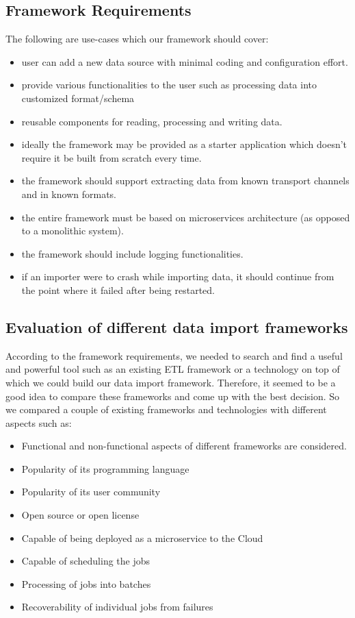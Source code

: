 \subsection{Framework Requirements}\label{framework-requirements}

The following are use-cases which our framework should cover:

\begin{itemize}
\tightlist
\item
  user can add a new data source with minimal coding and configuration
  effort.
\item
  provide various functionalities to the user such as processing data
  into customized format/schema
\item
  reusable components for reading, processing and writing data.
\item
  ideally the framework may be provided as a starter application which
  doesn't require it be built from scratch every time.
\item
  the framework should support extracting data from known transport
  channels and in known formats.
\item
  the entire framework must be based on microservices architecture (as
  opposed to a monolithic system).
\item
  the framework should include logging functionalities.
\item
  if an importer were to crash while importing data, it should continue
  from the point where it failed after being restarted.
\end{itemize}

\subsection{Evaluation of different data import
frameworks}\label{evaluation-of-different-data-import-frameworks}

According to the framework requirements, we needed to search and find a
useful and powerful tool such as an existing ETL framework or a
technology on top of which we could build our data import framework.
Therefore, it seemed to be a good idea to compare these frameworks and
come up with the best decision. So we compared a couple of existing
frameworks and technologies with different aspects such as:

\begin{itemize}
\tightlist
\item
  Functional and non-functional aspects of different frameworks are
  considered.
\item
  Popularity of its programming language
\item
  Popularity of its user community
\item
  Open source or open license
\item
  Capable of being deployed as a microservice to the Cloud
\item
  Capable of scheduling the jobs
\item
  Processing of jobs into batches
\item
  Recoverability of individual jobs from failures
\end{itemize}

